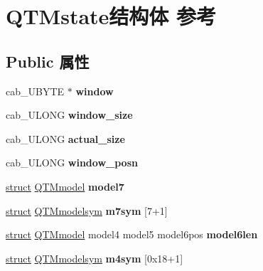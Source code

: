 \hypertarget{struct_q_t_mstate}{}\section{Q\+T\+Mstate结构体 参考}
\label{struct_q_t_mstate}
\subsection*{Public 属性}
\begin{DoxyCompactItemize}
\item 
\mbox{\label{struct_q_t_mstate_a1354085108448e5962a0e4ae436d9e8c}} 
cab\+\_\+\+U\+B\+Y\+TE $\ast$ {\bfseries window}
\item 
\mbox{\label{struct_q_t_mstate_a8ec8ee30631298328ecaa3237af7a034}} 
cab\+\_\+\+U\+L\+O\+NG {\bfseries window\+\_\+size}
\item 
\mbox{\label{struct_q_t_mstate_a385743c27c51f4174807de0b27fafa42}} 
cab\+\_\+\+U\+L\+O\+NG {\bfseries actual\+\_\+size}
\item 
\mbox{\label{struct_q_t_mstate_ac2fc75d7cbe92077dfa67d6d2e232bd9}} 
cab\+\_\+\+U\+L\+O\+NG {\bfseries window\+\_\+posn}
\item 
\mbox{\label{struct_q_t_mstate_aa1dd4226081a434abb58f563c7bded1c}} 
\hyperlink{interfacestruct}{struct} \hyperlink{struct_q_t_mmodel}{Q\+T\+Mmodel} {\bfseries model7}
\item 
\mbox{\label{struct_q_t_mstate_aa27cbced41405c0cc02cf18f716768ad}} 
\hyperlink{interfacestruct}{struct} \hyperlink{struct_q_t_mmodelsym}{Q\+T\+Mmodelsym} {\bfseries m7sym} \mbox{[}7+1\mbox{]}
\item 
\mbox{\label{struct_q_t_mstate_a2436e15b53bd03b403fca6aedcc31de6}} 
\hyperlink{interfacestruct}{struct} \hyperlink{struct_q_t_mmodel}{Q\+T\+Mmodel} model4 model5 model6pos {\bfseries model6len}
\item 
\mbox{\label{struct_q_t_mstate_a446e3974cd6a59a167175bb9c5c0e63d}} 
\hyperlink{interfacestruct}{struct} \hyperlink{struct_q_t_mmodelsym}{Q\+T\+Mmodelsym} {\bfseries m4sym} \mbox{[}0x18+1\mbox{]}

\end{DoxyCompactItemize}
